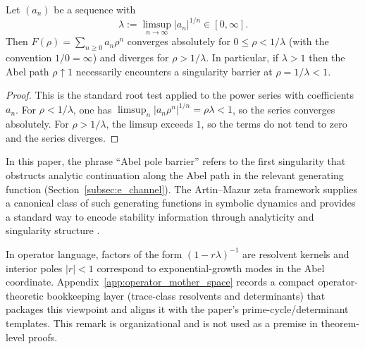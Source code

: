 \begin{lemma}\label{lem:abel_pole_barrier_root_test}
Let $(a_n)$ be a sequence with
\[
\lambda:=\limsup_{n\to\infty} |a_n|^{1/n}\in[0,\infty].
\]
Then $F(\rho)=\sum_{n\ge 0} a_n \rho^n$ converges absolutely for $0\le \rho<1/\lambda$ (with the convention $1/0=\infty$) and diverges for $\rho>1/\lambda$.
In particular, if $\lambda>1$ then the Abel path $\rho\uparrow 1$ necessarily encounters a singularity barrier at $\rho=1/\lambda<1$.
\end{lemma}
\begin{proof}
This is the standard root test applied to the power series with coefficients $a_n$.
For $\rho<1/\lambda$, one has $\limsup_n |a_n\rho^n|^{1/n}=\rho\lambda<1$, so the series converges absolutely.
For $\rho>1/\lambda$, the limsup exceeds $1$, so the terms do not tend to zero and the series diverges.
\end{proof}

\begin{remark}\label{rem:abel_pole_barrier_connection}
In this paper, the phrase ``Abel pole barrier'' refers to the first singularity that obstructs analytic continuation along the Abel path in the relevant generating function (Section~\ref{subsec:e_channel}).
The Artin--Mazur zeta framework supplies a canonical class of such generating functions in symbolic dynamics and provides a standard way to encode stability information through analyticity and singularity structure \cite{ArtinMazur1965,ParryPollicott1990,Ruelle1978}.
\end{remark}

\begin{remark}\label{rem:pole_barrier_resolvent_view}
\AuditTag In operator language, factors of the form $(1-r\lambda)^{-1}$ are resolvent kernels and interior poles $|r|<1$ correspond to exponential-growth modes in the Abel coordinate.
Appendix~\ref{app:operator_mother_space} records a compact operator-theoretic bookkeeping layer (trace-class resolvents and determinants) that packages this viewpoint and aligns it with the paper's prime-cycle/determinant templates.
This remark is organizational and is not used as a premise in theorem-level proofs.
\end{remark}


